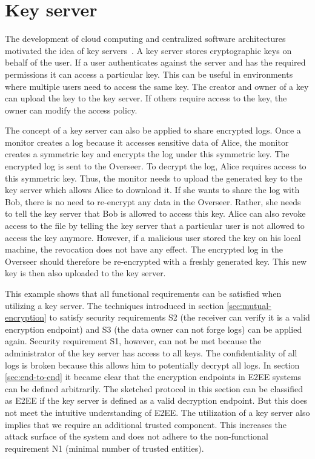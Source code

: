 \documentclass[../main.tex]{subfiles}
\begin{document}
\section{Key server}
\label{sec:key-server}
The development of cloud computing and centralized software architectures motivated the idea of key servers~\cite{Seitz2003}.
A key server stores cryptographic keys on behalf of the user.
If a user authenticates against the server and has the required permissions it can access a particular key.
This can be useful in environments where multiple users need to access the same key.
The creator and owner of a key can upload the key to the key server.
If others require access to the key, the owner can modify the access policy.

The concept of a key server can also be applied to share encrypted logs.
Once a monitor creates a log because it accesses sensitive data of Alice, the monitor creates a symmetric key and encrypts the log under this symmetric key.
The encrypted log is sent to the Overseer.
To decrypt the log, Alice requires access to this symmetric key.
Thus, the monitor needs to upload the generated key to the key server which allows Alice to download it.
If she wants to share the log with Bob, there is no need to re-encrypt any data in the Overseer.
Rather, she needs to tell the key server that Bob is allowed to access this key.
Alice can also revoke access to the file by telling the key server that a particular user is not allowed to access the key anymore.
However, if a malicious user stored the key on his local machine, the revocation does not have any effect.
The encrypted log in the Overseer should therefore be re-encrypted with a freshly generated key.
This new key is then also uploaded to the key server.

This example shows that all functional requirements can be satisfied when utilizing a key server.
The techniques introduced in section \ref{sec:mutual-encryption} to satisfy security requirements S2 (the receiver can verify it is a valid encryption endpoint) and S3 (the data owner can not forge logs) can be applied again.
Security requirement S1, however, can not be met because the administrator of the key server has access to all keys.
The confidentiality of all logs is broken because this allows him to potentially decrypt all logs.
In section \ref{sec:end-to-end} it became clear that the encryption endpoints in E2EE systems can be defined arbitrarily.
The sketched protocol in this section can be classified as E2EE if the key server is defined as a valid decryption endpoint.
But this does not meet the intuitive understanding of E2EE.
The utilization of a key server also implies that we require an additional trusted component.
This increases the attack surface of the system and does not adhere to the non-functional requirement N1 (minimal number of trusted entities).
\end{document}
